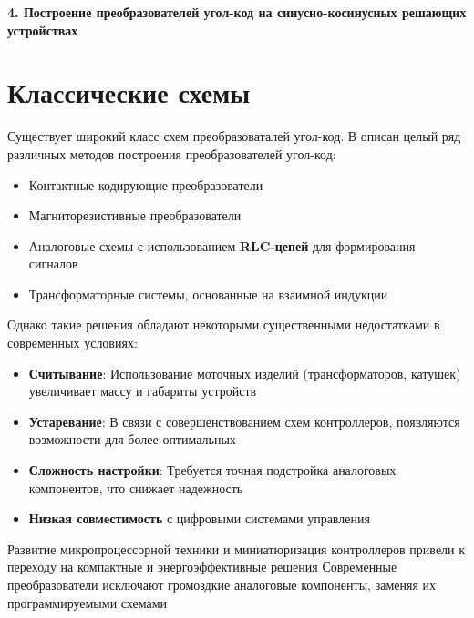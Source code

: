 \newpage
\begin{center}
  \textbf{\large 4. Построение преобразователей угол-код на синусно-косинусных решающих устройствах}
\end{center}


\section{Классические схемы}

Существует широкий класс схем преобразоваталей угол-код.
В \cite{Vulvet} описан целый ряд различных методов построения преобразователей угол-код: 

\begin{itemize}
  \item Контактные кодирующие преобразователи 
  \item Магниторезистивные преобразователи
  \item Аналоговые схемы с использованием \textbf{RLC-цепей} для формирования сигналов
  \item Трансформаторные системы, основанные на взаимной индукции
\end{itemize}

Однако такие решения обладают некоторыми существенными недостатками в современных условиях:
\begin{itemize}
  \item \textbf{Считывание}: Использование моточных изделий (трансформаторов, катушек) увеличивает массу и габариты устройств
  \item \textbf{Устаревание}: В связи с совершенствованием схем контроллеров, появляются возможности для более оптимальных
  \item \textbf{Сложность настройки}: Требуется точная подстройка аналоговых компонентов, что снижает надежность
  \item \textbf{Низкая совместимость} с цифровыми системами управления
\end{itemize}

Развитие микропроцессорной техники и миниатюризация контроллеров привели к переходу на компактные и энергоэффективные решения
Современные преобразователи исключают громоздкие аналоговые компоненты, заменяя их программируемыми схемами


